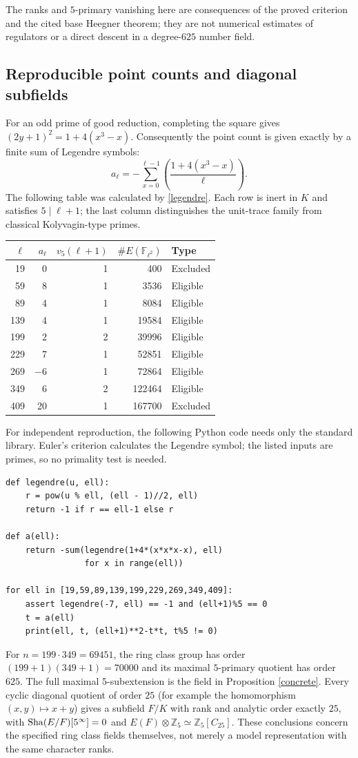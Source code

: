 \documentclass[11pt,a4paper]{article}
\numberwithin{equation}{section}
\begin{document}
\noindent The ranks and $5$-primary vanishing here are consequences of the proved criterion and the cited base Heegner theorem; they are not numerical estimates of regulators or a direct descent in a degree-$625$ number field.
\subsection{Reproducible point counts and diagonal subfields}
For an odd prime of good reduction, completing the square gives $(2y+1)^2=1+4(x^3-x)$. Consequently the point count is given exactly by a finite sum of Legendre symbols:
\begin{equation}\label{legendre}
a_\ell=-\sum_{x=0}^{\ell-1}\left(\frac{1+4(x^3-x)}{\ell}\right).
\end{equation}
The following table was calculated by \eqref{legendre}. Each row is inert in $K$ and satisfies $5\mid\ell+1$; the last column distinguishes the unit-trace family from classical Kolyvagin-type primes.
\begin{center}
\begin{tabular}{rrrrl}
\toprule
$\ell$&$a_\ell$&$v_5(\ell+1)$&$\#E(\mathbb F_{\ell^2})$&Type\\
\midrule
19&0&1&400&Excluded\\
59&8&1&3536&Eligible\\
89&4&1&8084&Eligible\\
139&4&1&19584&Eligible\\
199&2&2&39996&Eligible\\
229&7&1&52851&Eligible\\
269&$-6$&1&72864&Eligible\\
349&6&2&122464&Eligible\\
409&20&1&167700&Excluded\\
\bottomrule
\end{tabular}
\end{center}
\noindent For independent reproduction, the following Python code needs only the standard library. Euler's criterion calculates the Legendre symbol; the listed inputs are primes, so no primality test is needed.
\begin{verbatim}
def legendre(u, ell):
    r = pow(u % ell, (ell - 1)//2, ell)
    return -1 if r == ell-1 else r

def a(ell):
    return -sum(legendre(1+4*(x*x*x-x), ell)
                for x in range(ell))

for ell in [19,59,89,139,199,229,269,349,409]:
    assert legendre(-7, ell) == -1 and (ell+1)%5 == 0
    t = a(ell)
    print(ell, t, (ell+1)**2-t*t, t%5 != 0)
\end{verbatim}
For $n=199\cdot349=69451$, the ring class group has order $(199+1)(349+1)=70000$ and its maximal $5$-primary quotient has order $625$. The full maximal $5$-subextension is the field in Proposition \ref{concrete}. Every cyclic diagonal quotient of order $25$ (for example the homomorphism $(x,y)\mapsto x+y$) gives a subfield $F/K$ with rank and analytic order exactly $25$, with $\operatorname{Sha}(E/F)[5^\infty]=0$ and $E(F)\otimes\mathbb Z_5\simeq\mathbb Z_5[C_{25}]$. These conclusions concern the specified ring class fields themselves, not merely a model representation with the same character ranks.
\end{document}
